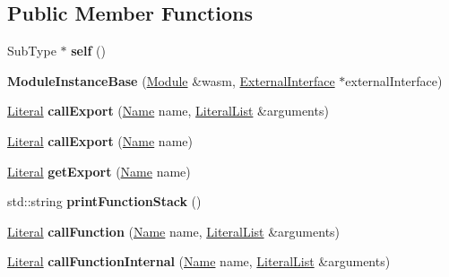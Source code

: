 \subsection*{Public Member Functions}
\begin{DoxyCompactItemize}
\item 
\mbox{\label{classwasm_1_1_module_instance_base_a42e236ba33980d2e7325f1d15795a8e1}} 
Sub\+Type $\ast$ {\bfseries self} ()
\item 
\mbox{\label{classwasm_1_1_module_instance_base_af3a5f758af7673d05e09cc94e7a736ee}} 
{\bfseries Module\+Instance\+Base} (\mbox{\hyperlink{classwasm_1_1_module}{Module}} \&wasm, \mbox{\hyperlink{structwasm_1_1_module_instance_base_1_1_external_interface}{External\+Interface}} $\ast$external\+Interface)
\item 
\mbox{\label{classwasm_1_1_module_instance_base_ac4f4911ef3de41dc800961d662c3a466}} 
\mbox{\hyperlink{classwasm_1_1_literal}{Literal}} {\bfseries call\+Export} (\mbox{\hyperlink{structwasm_1_1_name}{Name}} name, \mbox{\hyperlink{classstd_1_1vector}{Literal\+List}} \&arguments)
\item 
\mbox{\label{classwasm_1_1_module_instance_base_ac81667231f6d83257b44de4743ab0dd0}} 
\mbox{\hyperlink{classwasm_1_1_literal}{Literal}} {\bfseries call\+Export} (\mbox{\hyperlink{structwasm_1_1_name}{Name}} name)
\item 
\mbox{\label{classwasm_1_1_module_instance_base_a9cda22ae6b060049d1cd266aae515717}} 
\mbox{\hyperlink{classwasm_1_1_literal}{Literal}} {\bfseries get\+Export} (\mbox{\hyperlink{structwasm_1_1_name}{Name}} name)
\item 
\mbox{\label{classwasm_1_1_module_instance_base_a6a2757f26b8c71180ea78809c74605f5}} 
std\+::string {\bfseries print\+Function\+Stack} ()
\item 
\mbox{\label{classwasm_1_1_module_instance_base_af2090d0209fb093bb9323a59b8940a40}} 
\mbox{\hyperlink{classwasm_1_1_literal}{Literal}} {\bfseries call\+Function} (\mbox{\hyperlink{structwasm_1_1_name}{Name}} name, \mbox{\hyperlink{classstd_1_1vector}{Literal\+List}} \&arguments)
\item 
\mbox{\label{classwasm_1_1_module_instance_base_aa1504ccb05636a927cb56d46570bd1ea}} 
\mbox{\hyperlink{classwasm_1_1_literal}{Literal}} {\bfseries call\+Function\+Internal} (\mbox{\hyperlink{structwasm_1_1_name}{Name}} name, \mbox{\hyperlink{classstd_1_1vector}{Literal\+List}} \&arguments)
\end{DoxyCompactItemize}
